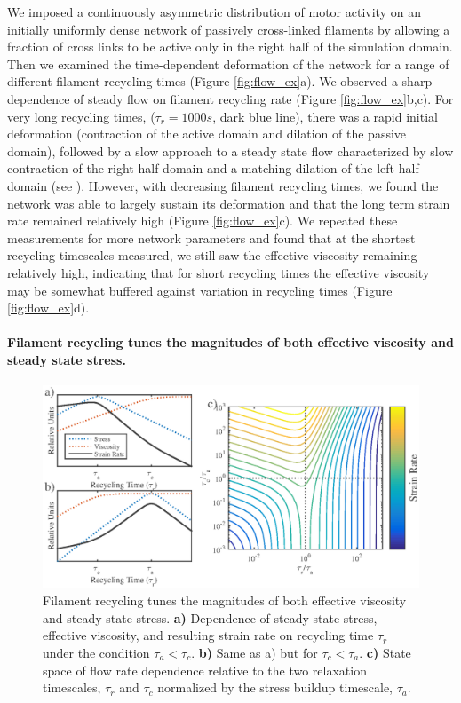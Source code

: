 \documentclass[10pt,letterpaper]{article}
\begin{document}
We imposed a continuously asymmetric distribution of motor activity on an initially uniformly dense network of passively cross-linked filaments by allowing a fraction of cross links to be active only in the right half of the simulation domain. Then we examined the time-dependent deformation of the network for a range of different filament recycling times (Figure \ref{fig:flow_ex}a). We observed a sharp dependence of steady flow on filament recycling rate (Figure \ref{fig:flow_ex}b,c). For very long recycling times, ($\tau_r=1000 s$, dark blue line), there was a rapid initial deformation (contraction of the active domain and dilation of the passive domain), followed by a slow approach to a steady state flow characterized by slow contraction of the right half-domain and a matching dilation of the left half-domain (see ).  However, with decreasing filament recycling times, we found the network was able to largely sustain its deformation and that the long term strain rate remained relatively high (Figure \ref{fig:flow_ex}c).  We repeated these measurements for more network parameters and found that at the shortest recycling timescales measured, we still saw the effective viscosity remaining relatively high, indicating that for short recycling times the effective viscosity may be somewhat buffered against variation in recycling times (Figure \ref{fig:flow_ex}d).







\paragraph{Filament recycling tunes the magnitudes of both effective viscosity and steady state stress.}  


\begin{figure}[h!]
	\centering
	\includegraphics[width=\hsize]{figures/figure9}
	\caption{\label{fig:flow_theo}  Filament recycling tunes the magnitudes of both effective viscosity and steady state stress. \textbf{a)}  Dependence of steady state stress, effective viscosity, and resulting strain rate on recycling time $\tau_r$ under the condition $\tau_a<\tau_c$. \textbf{b)} Same as a) but for $\tau_c<\tau_a$.  \textbf{c)} State space of flow rate dependence relative to the two relaxation timescales, $\tau_r$ and $\tau_c$ normalized by the stress buildup timescale, $\tau_a$.  }
\end{figure}
\end{document}
